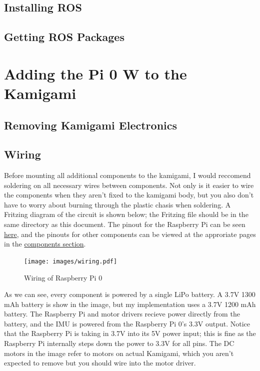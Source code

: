 \documentclass[11pt]{article}
\begin{document}
\subsection{Installing ROS}

\subsection{Getting ROS Packages}

\section{Adding the Pi 0 W to the Kamigami}

\subsection{Removing Kamigami Electronics}

\subsection{Wiring}

Before mounting all additional components to the kamigami, I would reccomend soldering on all necessary wires between components. Not only is it easier to wire the components when they aren't fixed to the kamigami body, but you also don't have to worry about burning through the plastic chasis when soldering. A Fritzing diagram of the circuit is shown below; the Fritzing file should be in the same directory as this document.
The pinout for the Raspberry Pi can be seen \href{https://pinout.xyz}{here},
and the pinouts for other components can be viewed at the approriate pages in the \hyperref[sec:components]{components section}.

\begin{figure}[h]
    \centering
    \texttt{[image: images/wiring.pdf]}
    \caption{Wiring of Raspberry Pi 0}
    \label{fig:wiring}
\end{figure}

As we can see, every component is powered by a single LiPo battery. A 3.7V 1300 mAh battery is show in the image, but my implementation uses a 3.7V 1200 mAh battery. The Raspberry Pi and motor drivers recieve power directly from the battery, and the IMU is powered from the Raspberry Pi 0's 3.3V output. Notice that the Raspberry Pi is taking in 3.7V into its 5V power input; this is fine as the Raspberry Pi internally steps down the power to 3.3V for all pins. The DC motors in the image refer to motors on actual Kamigami, which you aren't expected to remove but you should wire into the motor driver.
\end{document}
